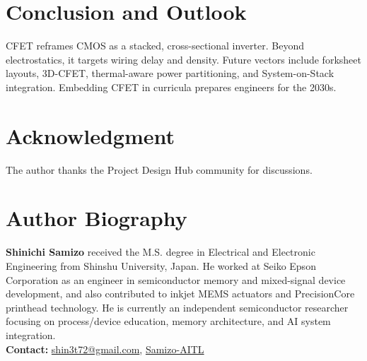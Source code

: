 \documentclass[conference]{IEEEtran}
\begin{document}
\section{Conclusion and Outlook}
CFET reframes CMOS as a stacked, cross-sectional inverter.
Beyond electrostatics, it targets wiring delay and density.
Future vectors include forksheet layouts, 3D-CFET, thermal-aware power partitioning, and System-on-Stack integration.
Embedding CFET in curricula prepares engineers for the 2030s.

\section*{Acknowledgment}
The author thanks the Project Design Hub community for discussions.




\section*{Author Biography}
\noindent\textbf{Shinichi Samizo}
received the M.S. degree in Electrical and Electronic Engineering from Shinshu University, Japan.
He worked at Seiko Epson Corporation as an engineer in semiconductor memory and mixed-signal device development, and also contributed to inkjet MEMS actuators and PrecisionCore printhead technology.
He is currently an independent semiconductor researcher focusing on process/device education, memory architecture, and AI system integration.\\[2pt]
\textbf{Contact:} \href{mailto:shin3t72@gmail.com}{shin3t72@gmail.com}, \href{https://github.com/Samizo-AITL}{Samizo-AITL}
\end{document}
